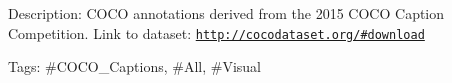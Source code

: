 Description\+: C\+O\+CO annotations derived from the 2015 C\+O\+CO Caption Competition. Link to dataset\+: \href{http://cocodataset.org/#download}{\tt http\+://cocodataset.\+org/\#download}

Tags\+: \#\+C\+O\+C\+O\+\_\+\+Captions, \#\+All, \#\+Visual 